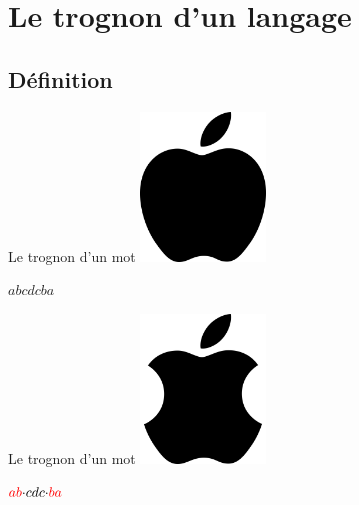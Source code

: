 \section{Le trognon d'un langage}

\subsection{Définition}


\begin{frame}{\myframetitle}
  \begin{block}{Le trognon d'un mot}
    \centering
    \includegraphics[width=0.25\textwidth]{./resources/full_apple.png}

    \pause[]

    \vphantom{}

    \Large{\(abcdcba\)}
  \end{block}
\end{frame}

\begin{frame}{\myframetitle}
  \begin{block}{Le trognon d'un mot}
    \centering
    \includegraphics[width=0.25\textwidth]{./resources/mid_apple.png}

    \pause[]

    \vphantom{}

    \Large{\(\color{red}{ab} \color{black}{\cdot cdc \cdot} \color{red}{ba}\)}
  \end{block}
\end{frame}

